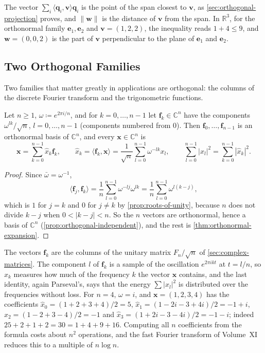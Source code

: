 The vector $\sum_i\langle\mathbf q_i,\mathbf v\rangle\mathbf q_i$ is the point of the span closest to $\mathbf v$, as \cref{sec:orthogonal-projection} proves, and $\|\mathbf w\|$ is the distance of $\mathbf v$ from the span. In $\mathbb R^3$, for the orthonormal family $\mathbf e_1,\mathbf e_2$ and $\mathbf v=(1,2,2)$, the inequality reads $1+4\le9$, and $\mathbf w=(0,0,2)$ is the part of $\mathbf v$ perpendicular to the plane of $\mathbf e_1$ and $\mathbf e_2$.

\subsection{Two Orthogonal Families}

Two families that matter greatly in applications are orthogonal: the columns of the discrete Fourier transform and the trigonometric functions.

\begin{proposition}
\label{prop:fourier-basis}
Let $n\ge1$, $\omega\coloneqq e^{2\pi i/n}$, and for $k=0,\ldots,n-1$ let $\mathbf f_k\in\mathbb C^n$ have the components $\omega^{lk}/\sqrt n$, $l=0,\ldots,n-1$ (components numbered from $0$). Then $\mathbf f_0,\ldots,\mathbf f_{n-1}$ is an orthonormal basis of $\mathbb C^n$, and every $\mathbf x\in\mathbb C^n$ is
\[
\mathbf x=\sum_{k=0}^{n-1}\hat x_k\mathbf f_k,\qquad\hat x_k=\langle\mathbf f_k,\mathbf x\rangle=\frac1{\sqrt n}\sum_{l=0}^{n-1}\omega^{-lk}x_l,\qquad\sum_{l=0}^{n-1}|x_l|^2=\sum_{k=0}^{n-1}|\hat x_k|^2 .
\]
\end{proposition}

\begin{proof}
Since $\bar\omega=\omega^{-1}$,
\[
\langle\mathbf f_j,\mathbf f_k\rangle=\frac1n\sum_{l=0}^{n-1}\omega^{-lj}\omega^{lk}=\frac1n\sum_{l=0}^{n-1}\omega^{l(k-j)},
\]
which is $1$ for $j=k$ and $0$ for $j\ne k$ by \cref{prop:roots-of-unity}, because $n$ does not divide $k-j$ when $0<|k-j|<n$. So the $n$ vectors are orthonormal, hence a basis of $\mathbb C^n$ (\cref{prop:orthogonal-independent}), and the rest is \cref{thm:orthonormal-expansion}.
\end{proof}

The vectors $\mathbf f_k$ are the columns of the unitary matrix $F_n/\sqrt n$ of \cref{sec:complex-matrices}. The component $l$ of $\mathbf f_k$ is a sample of the oscillation $e^{2\pi ikt}$ at $t=l/n$, so $\hat x_k$ measures how much of the frequency $k$ the vector $\mathbf x$ contains, and the last identity, again Parseval's, says that the energy $\sum|x_l|^2$ is distributed over the frequencies without loss. For $n=4$, $\omega=i$, and $\mathbf x=(1,2,3,4)$ has the coefficients $\hat x_0=(1+2+3+4)/2=5$, $\hat x_1=(1-2i-3+4i)/2=-1+i$, $\hat x_2=(1-2+3-4)/2=-1$ and $\hat x_3=(1+2i-3-4i)/2=-1-i$; indeed $25+2+1+2=30=1+4+9+16$. Computing all $n$ coefficients from the formula costs about $n^2$ operations, and the fast Fourier transform of Volume~XI reduces this to a multiple of $n\log n$.

